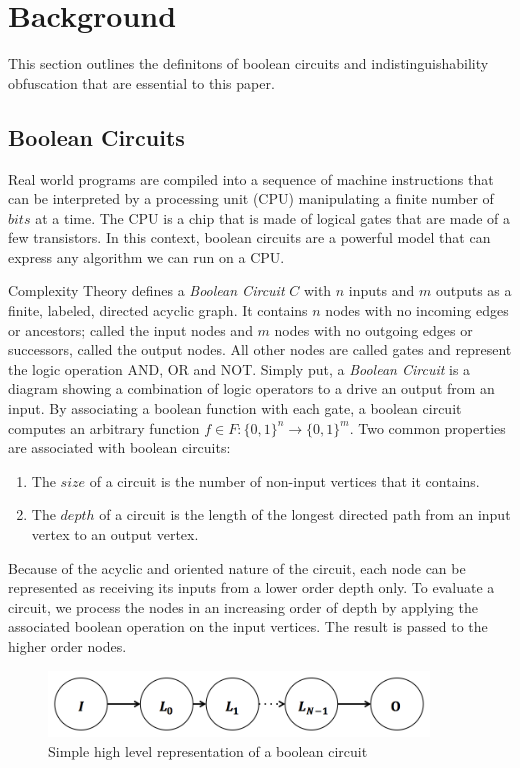 \section{Background}
This section outlines the definitons of boolean circuits and indistinguishability obfuscation that are essential to this paper.
\par
\subsection{Boolean Circuits}
Real world programs are compiled into a sequence of machine instructions that can be interpreted by a processing unit (CPU) manipulating a finite number of $bits$ at a time. The CPU is a chip that is made of logical gates that are made of a few transistors. In this context, boolean circuits are a powerful model that can express any algorithm we can run on a CPU\cite{cpu}.
\par
Complexity Theory defines a \textit{Boolean Circuit} $C$ with $n$ inputs and $m$ outputs as a finite, labeled, directed acyclic graph. It contains $n$ nodes with no incoming edges or ancestors; called the input nodes and $m$ nodes with no outgoing edges or successors, called the output nodes. All other nodes are called gates and represent the logic operation AND, OR and NOT\cite{bool}. Simply put, a \textit{Boolean Circuit}  is a diagram showing a combination of logic operators to a drive an output from an input. By associating a boolean function with each gate, a boolean circuit computes an arbitrary function $f \in F :  \{0,1\}^n \to \{0,1\}^m$. Two common properties are associated with boolean circuits: 
\begin{enumerate}  
	\item The $size$ of a circuit is the number of non-input vertices that it contains. 
	\item The $depth$ of a circuit is the length of the longest directed path from an input vertex to an output vertex. 
\end{enumerate}
Because of the acyclic and oriented nature of the circuit, each node can be represented as receiving its inputs from a lower order depth only. To evaluate a circuit, we process the nodes in an increasing order of depth by applying the associated boolean operation on the input vertices. The result is passed to the higher order nodes.
\par
\begin{figure}[h]
	\center
	\includegraphics[width=0.9\textwidth]{img/graph.png}
	\caption{Simple high level representation of a boolean circuit}
\end{figure}
